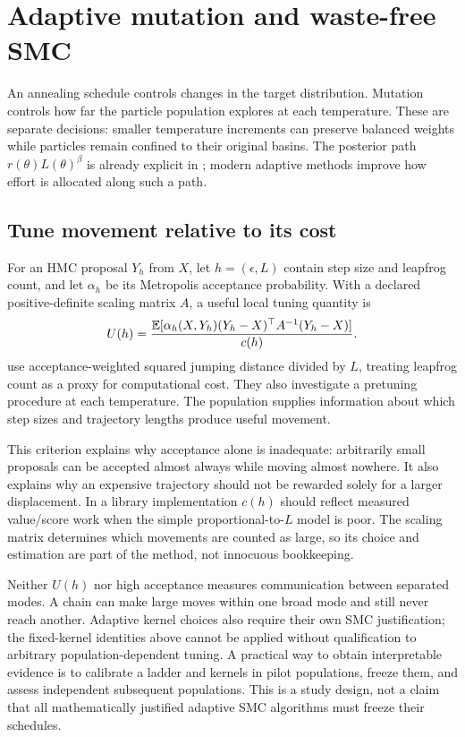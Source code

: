 \section{Adaptive mutation and waste-free SMC}
\label{sec:bf-is-modern-smc-mutation}

An annealing schedule controls changes in the target distribution. Mutation
controls how far the particle population explores at each temperature.
These are separate decisions: smaller temperature increments can preserve
balanced weights while particles remain confined to their original basins.
The posterior path $r(\theta)L(\theta)^\beta$ is already explicit in
\citet[Section 4.2.2]{delmoral2006smc}; modern adaptive methods improve how
effort is allocated along such a path.

\subsection{Tune movement relative to its cost}

For an HMC proposal $Y_h$ from $X$, let $h=(\epsilon,L)$ contain step size
and leapfrog count, and let $\alpha_h$ be its Metropolis acceptance
probability. With a declared positive-definite scaling matrix $A$, a useful
local tuning quantity is
\begin{equation}
 U(h)=\frac{\mathbb{E}[\alpha_h(X,Y_h)
                (Y_h-X)^\top A^{-1}(Y_h-X)]}{c(h)}.
 \label{eq:bf-is-smc-movement-cost}
\end{equation}
\citet[Section 3.2, Equation 6]{buchholz2021hmcsmc} use acceptance-weighted
squared jumping distance divided by $L$, treating leapfrog count as a proxy
for computational cost. They also investigate a pretuning procedure at each
temperature. The population supplies information about which step sizes and
trajectory lengths produce useful movement.

This criterion explains why acceptance alone is inadequate: arbitrarily small
proposals can be accepted almost always while moving almost nowhere.
It also explains why an expensive trajectory should not be rewarded solely
for a larger displacement. In a library implementation $c(h)$ should reflect
measured value/score work when the simple proportional-to-$L$ model is poor.
The scaling matrix determines which movements are counted as large, so its
choice and estimation are part of the method, not innocuous bookkeeping.

Neither $U(h)$ nor high acceptance measures communication between separated
modes. A chain can make large moves within one broad mode and still never
reach another. Adaptive kernel choices also require their own SMC
justification; the fixed-kernel identities above cannot be applied without
qualification to arbitrary population-dependent tuning. A practical way to
obtain interpretable evidence is to calibrate a ladder and kernels in pilot
populations, freeze them, and assess independent subsequent populations.
This is a study design, not a claim that all mathematically justified
adaptive SMC algorithms must freeze their schedules.

